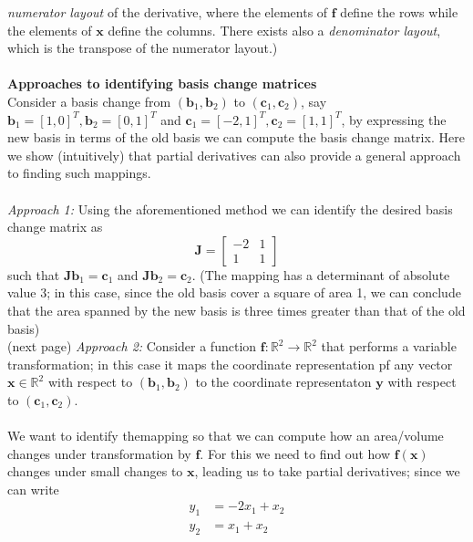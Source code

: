 \documentclass{report}
\begin{document}
\textit{numerator layout} of the derivative, where the elements of $\bm{f}$ define the rows while the elements of 
$\bm{x}$ define the columns. There exists also a \textit{denominator layout}, which is the transpose of the
numerator layout.)\\
\vspace{1mm}\\
\textbf{Approaches to identifying basis change matrices}\\
Consider a basis change from $(\bm{b}_1,\bm{b}_2)$ to
$(\bm{c}_1,\bm{c}_2)$, say $\bm{b}_1=[1,0]^T,\bm{b}_2=[0,1]^T$ and $\bm{c}_1=[-2,1]^T,\bm{c}_2=[1,1]^T$,
by expressing the new basis in terms of the old basis we can compute the basis change matrix. 
Here we show (intuitively) that partial derivatives can also provide a general approach to finding such mappings.\\
\vspace{1mm}\\
\textit{Approach 1:} Using the aforementioned method we can identify the desired basis change matrix as 
\begin{equation*}
\bm{J}=\begin{bmatrix}-2&1\\1&1\end{bmatrix}
\end{equation*}
such that $\bm{Jb}_1=\bm{c}_1$ and $\bm{Jb}_2=\bm{c}_2$. (The mapping has a determinant of absolute value 3; in
this case, since the old basis cover a square of area 1, we can conclude that the area spanned
by the new basis is three times greater than that of the old basis)\\
(next page)
\newpage
\noindent\textit{Approach 2:} Consider a function $\bm{f}:\mathbb{R}^2\to\mathbb{R}^2$ that performs a variable transformation; in this case it maps the coordinate
representation pf any vector $\bm{x}\in\mathbb{R}^2$ with respect to $(\bm{b}_1,\bm{b}_2)$ to
the coordinate representaton $\bm{y}$ with respect to $(\bm{c}_1,\bm{c}_2)$.\\
\vspace{1mm}\\
We want to identify themapping so that we can compute how an area/volume changes under transformation by $\bm{f}$. 
For this we need to find out how $\bm{f}(\bm{x})$ changes under small changes to $\bm{x}$, 
leading us to take partial derivatives; since we can write
\begin{align*}
y_1&=-2x_1+x_2\\
y_2&=x_1+x_2
\end{align*}
\end{document}
